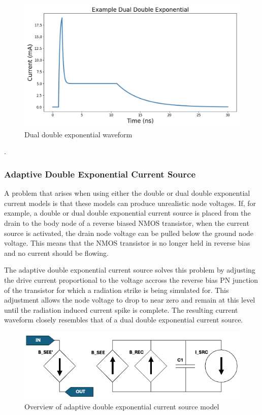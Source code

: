 \documentclass[conference]{IEEEtran}
\begin{document}
\begin{figure}[htbp]
\centering
\includegraphics[width=0.95\linewidth]{EX_Dual_Double_Exponential.png}
\caption{Dual double exponential waveform}
\label{fig:dual_double_exp}
\end{figure}

\cite{Pepper1990}.

\subsubsection{Adaptive Double Exponential Current Source}
A problem that arises when using either the double or dual double exponential current models is that these models can produce unrealistic node voltages. If, for example, a double or dual double exponential current source is placed from the drain to the body node of a reverse biased NMOS transistor, when the current source is activated, the drain node voltage can be pulled below the ground node voltage. This means that the NMOS transistor is no longer held in reverse bias and no current should be flowing.

The adaptive double exponential current source solves this problem by adjusting the drive current proportional to the voltage accross the reverse bias PN junction of the transistor for which a radiation strike is being simulated for. This adjustment allows the node voltage to drop to near zero and remain at this level until the radiation induced current spike is complete. The resulting current waveform closely resembles that of a dual double exponential current source.

\begin{figure}[htbp]
\centering
\includegraphics[width=0.95\linewidth]{Adaptive_Model_Cropped.png}
\caption{Overview of adaptive double exponential current source model \cite{Kauppila2009}}
\label{fig:adaptive_model_overview}
\end{figure}
\end{document}
